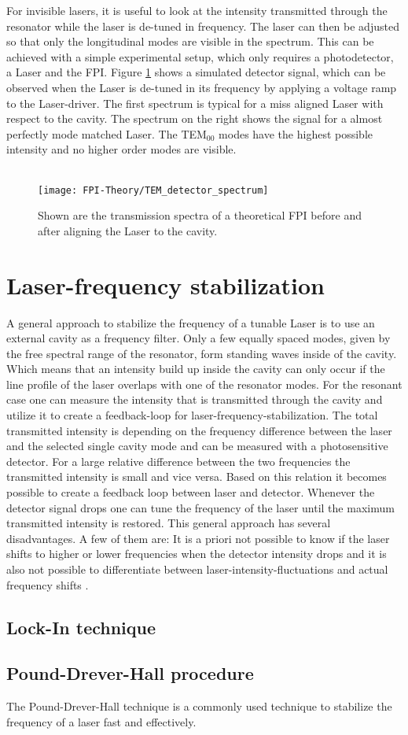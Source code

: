\noindent
For invisible lasers, it is useful to look at the intensity transmitted through the resonator while the laser is de-tuned in frequency. The laser can then be adjusted so that only the longitudinal modes are visible in the spectrum. This can be achieved with a simple experimental setup, which only requires a photodetector, a Laser and the FPI. Figure \ref{figure:FPI_TEM_detector_spectrum} shows a simulated detector signal, which can be observed when the Laser is de-tuned in its frequency by applying a voltage ramp to the Laser-driver. The first spectrum is typical for a miss aligned Laser with respect to the cavity. The spectrum on the right shows the signal for a almost perfectly mode matched Laser. The TEM$_{00}$ modes have the highest possible intensity and no higher order modes are visible.\\\\
\begin{figure}[H]
	\centering
	\texttt{[image: FPI-Theory/TEM\_detector\_spectrum]}
	\caption{Shown are the transmission spectra of a theoretical FPI before and after aligning the Laser to the cavity.}
	\label{figure:FPI_TEM_detector_spectrum}
\end{figure}
\newpage
\section{Laser-frequency stabilization}
A general approach to stabilize the frequency of a tunable Laser is to use an external cavity as a frequency filter. Only a few equally spaced modes, given by the free spectral range of the resonator, form standing waves inside of the cavity. Which means that an intensity build up inside the cavity can only occur if the line profile of the laser overlaps with one of the resonator modes. For the resonant case one can measure the intensity that is transmitted through the cavity and utilize it to create a feedback-loop for laser-frequency-stabilization. The total transmitted intensity is depending on the frequency difference between the laser and the selected single cavity mode and can be measured with a photosensitive detector. For a large relative difference between the two frequencies the transmitted intensity is small and vice versa. Based on this relation it becomes possible to create a feedback loop between laser and detector. Whenever the detector signal drops one can tune the frequency of the laser until the maximum transmitted intensity is restored. This general approach has several disadvantages. A few of them are: It is a priori not possible to know if the laser shifts to higher or lower frequencies when the detector intensity drops and it is also not possible to differentiate between laser-intensity-fluctuations and actual frequency shifts \cite{Black2001}.
\subsection{Lock-In technique}
\subsection{Pound-Drever-Hall procedure}
The Pound-Drever-Hall technique is a commonly used technique to stabilize the frequency of a laser fast and effectively.